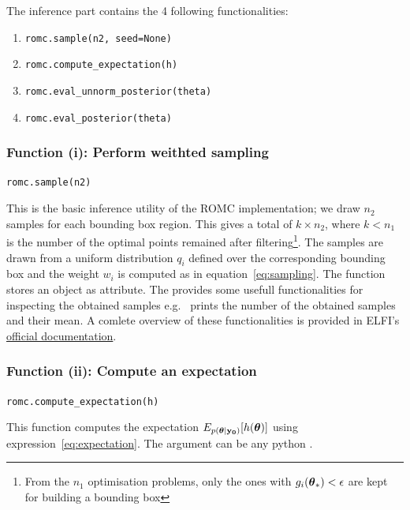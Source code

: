 The inference part contains the 4 following functionalities:

\begin{enumerate}[label=(\roman*)]
\item \texttt{romc.sample(n2, seed=None)}
\item \texttt{romc.compute_expectation(h)}  
\item \texttt{romc.eval_unnorm_posterior(theta)}
\item \texttt{romc.eval_posterior(theta)}
\end{enumerate}

\subsubsection*{Function (i): Perform weithted sampling}

\texttt{romc.sample(n2)}
\vspace{5mm}

\noindent
This is the basic inference utility of the ROMC implementation; we
draw $n_2$ samples for each bounding box region. This gives a total of
$k \times n_2$, where $k < n_1$ is the number of the optimal points
remained after filtering\footnote{From the $n_1$ optimisation
  problems, only the ones with $g_i(\boldsymbol{\theta}_*) < \epsilon$ are kept
  for building a bounding box}. The samples are drawn from a uniform
distribution $q_i$ defined over the corresponding bounding box and the
weight $w_i$ is computed as in equation~\eqref{eq:sampling}. The
function stores an  object as
 attribute. The  provides
some usefull functionalities for inspecting the obtained samples e.g.\
 prints the number of the obtained
samples and their mean. A comlete overview of these functionalities is
provided in ELFI's
\href{https://elfi.readthedocs.io/en/latest/api.html#elfi.methods.results.Sample}{official
  documentation}.

\subsubsection*{Function (ii): Compute an expectation}

\texttt{romc.compute_expectation(h)}
\vspace{5mm}

\noindent
This function computes the expectation
$E_{p(\boldsymbol{\theta}|\mathbf{y_0})}[h(\boldsymbol{\theta})]$ using
expression~\eqref{eq:expectation}. The argument  can be
any python \pinline{Callable}.

